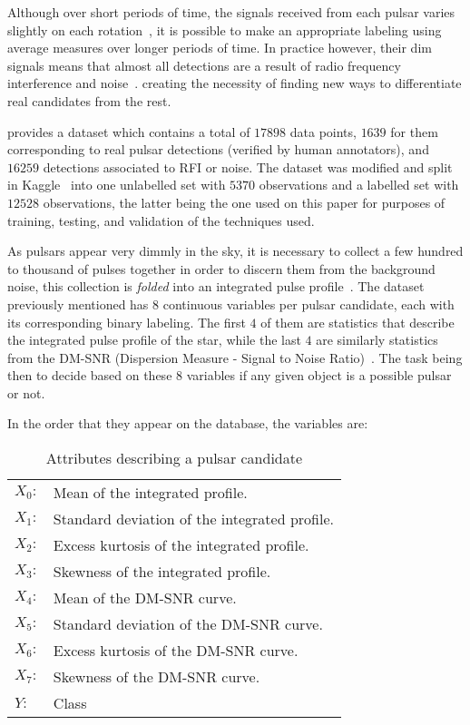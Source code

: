 \documentclass[journal]{IEEEtran}
\begin{document}
Although over short periods of time, the signals received from each pulsar
varies slightly on each rotation~\cite{pulsar:importance:kramer}, it is possible
to make an appropriate labeling using average measures over longer periods of
time. In practice however, their dim signals means that almost all detections
are a result of radio frequency interference and
noise~\cite{pulsar:dataset:explanation:lyon}. creating the necessity of finding
new ways to differentiate real candidates from the rest.

\citet{pulsar:dataset:lyon} provides a dataset which contains a total of $17898$
data points, $1639$ for them corresponding to real pulsar detections (verified
by human annotators), and $16259$ detections associated to RFI or noise. The
dataset was modified and split in Kaggle~\cite{pulsar:dataset:kaggle} into one
unlabelled set with $5370$ observations and a labelled set with $12528$
observations, the latter being the one used on this paper for purposes of
training, testing, and validation of the techniques used.

As pulsars appear very dimmly in the sky, it is necessary to collect a few
hundred to thousand of pulses together in order to discern them from the
background noise, this collection is \textit{folded} into an integrated pulse
profile~\cite{pulsar:importance:kramer}. The dataset previously mentioned has 8
continuous variables per pulsar candidate, each with its corresponding binary
labeling. The first $4$ of them are statistics that describe the integrated
pulse profile of the star, while the last $4$ are similarly statistics from the
DM-SNR (Dispersion Measure - Signal to Noise
Ratio)~\cite{pulsar:dataset:explanation:lyon}. The task being then to decide
based on these 8 variables if any given object is a possible pulsar or not.

In the order that they appear on the database, the variables are:

\begin{table}[ht]
    \begin{tabular}{l|l}
        $X_0:$ & Mean of the integrated profile.\\
        $X_1:$ & Standard deviation of the integrated profile.\\
        $X_2:$ & Excess kurtosis of the integrated profile.\\
        $X_3:$ & Skewness of the integrated profile.\\
        $X_4:$ & Mean of the DM-SNR curve.\\
        $X_5:$ & Standard deviation of the DM-SNR curve.\\
        $X_6:$ & Excess kurtosis of the DM-SNR curve.\\
        $X_7:$ & Skewness of the DM-SNR curve.\\
        $Y:$   & Class 
    \end{tabular}
    \caption{Attributes describing a pulsar candidate\label{tab:variables}}
\end{table}
\end{document}
